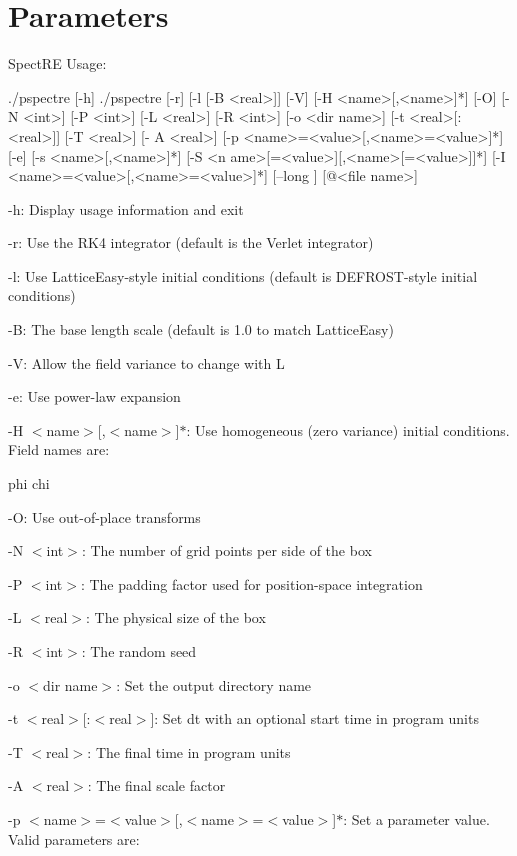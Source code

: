 \hypertarget{running_Command-Line}{}\section{Parameters}\label{running_Command-Line}
SpectRE Usage: 
\begin{DoxyCode}
 ./pspectre [-h]
 ./pspectre [-r] [-l [-B <real>]] [-V] [-H <name>[,<name>]*] [-O] [-N <int>] [-P 
      <int>] [-L <real>] [-R <int>] [-o <dir name>] [-t <real>[:<real>]] [-T <real>] [-
      A <real>] [-p <name>=<value>[,<name>=<value>]*] [-e] [-s <name>[,<name>]*] [-S <n
      ame>[=<value>][,<name>[=<value>]]*] [-I <name>=<value>[,<name>=<value>]*] [--long
      ] [@<file name>]
\end{DoxyCode}


\begin{DoxyItemize}
\item -\/h: Display usage information and exit \item -\/r: Use the RK4 integrator (default is the Verlet integrator) \item -\/l: Use LatticeEasy-\/style initial conditions (default is DEFROST-\/style initial conditions) \item -\/B: The base length scale (default is 1.0 to match LatticeEasy) \item -\/V: Allow the field variance to change with L \item -\/e: Use power-\/law expansion \item -\/H $<$name$>$\mbox{[},$<$name$>$\mbox{]}$\ast$: Use homogeneous (zero variance) initial conditions. Field names are: 
\begin{DoxyCode}
      phi
      chi
\end{DoxyCode}
 \item -\/O: Use out-\/of-\/place transforms \item -\/N $<$int$>$: The number of grid points per side of the box \item -\/P $<$int$>$: The padding factor used for position-\/space integration \item -\/L $<$real$>$: The physical size of the box \item -\/R $<$int$>$: The random seed \item -\/o $<$dir name$>$: Set the output directory name \item -\/t $<$real$>$\mbox{[}:$<$real$>$\mbox{]}: Set dt with an optional start time in program units \item -\/T $<$real$>$: The final time in program units \item -\/A $<$real$>$: The final scale factor \item -\/p $<$name$>$=$<$value$>$\mbox{[},$<$name$>$=$<$value$>$\mbox{]}$\ast$: Set a parameter value. Valid parameters are: 

\end{DoxyItemize}
